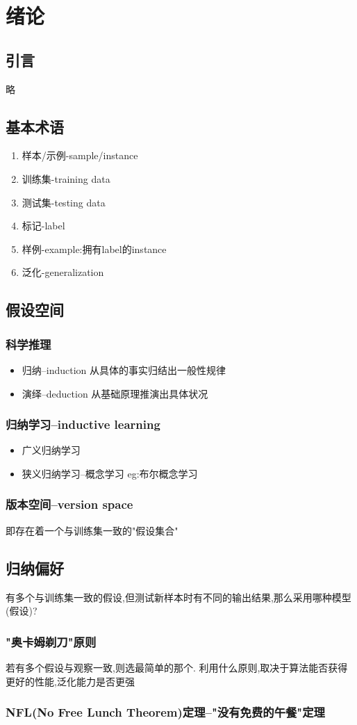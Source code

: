 \section{绪论}
\subsection{引言}
略
\subsection{基本术语}
\begin{enumerate}[label=(\roman*)]
    \item 样本/示例-sample/instance
    \item 训练集-training data
    \item 测试集-testing data
    \item 标记-label 
    \item 样例-example:拥有label的instance
    \item 泛化-generalization
\end{enumerate}
\subsection{假设空间}
\subsubsection{科学推理}
\begin{itemize}
    \item 归纳--induction
    从具体的事实归结出一般性规律
    \item 演绎--deduction
    从基础原理推演出具体状况
\end{itemize}
\subsubsection{归纳学习--inductive learning}
\begin{itemize}
    \item 广义归纳学习
    \item 狭义归纳学习--概念学习
    eg:布尔概念学习
\end{itemize}
\subsubsection{版本空间--version space}
即存在着一个与训练集一致的"假设集合"
\subsection{归纳偏好}
有多个与训练集一致的假设,但测试新样本时有不同的输出结果,那么采用哪种模型(假设)?
\subsubsection{"奥卡姆剃刀"原则}
若有多个假设与观察一致,则选最简单的那个.
利用什么原则,取决于算法能否获得更好的性能,泛化能力是否更强
\subsubsection{NFL(No Free Lunch Theorem)定理--"没有免费的午餐"定理}




